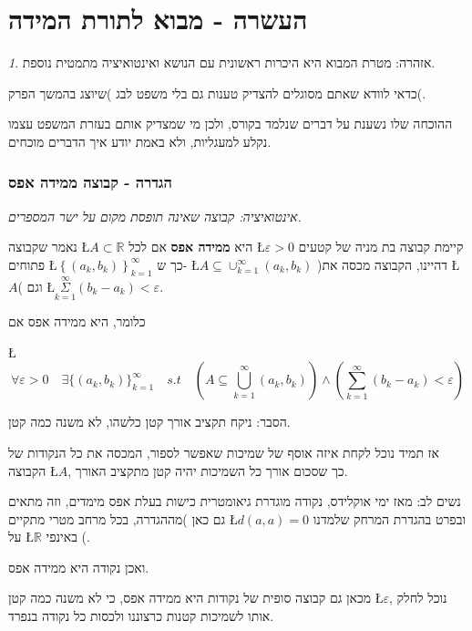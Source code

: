 \documentclass[english,hebrew]{article}
\theoremstyle{remark}
\newtheorem*{rem*}{\protect\remarkname}
\theoremstyle{definition}
\theoremstyle{plain}
\theoremstyle{remark}
\theoremstyle{plain}
\theoremstyle{plain}
\providecommand{\remarkname}{הערה}
\begin{document}
\part{העשרה - מבוא לתורת המידה}
\begin{rem*}
אזהרה: מטרת המבוא היא היכרות ראשונית עם הנושא ואינטואיציה מתמטית נוספת.

כדאי לוודא שאתם מסוגלים להצדיק טענות גם בלי משפט לבג )שיוצג בהמשך
הפרק(.

ההוכחה שלו נשענת על דברים שנלמד בקורס, ולכן מי שמצדיק אותם בעזרת המשפט
עצמו נקלע למעגליות, ולא באמת יודע איך הדברים מוכחים.
\end{rem*}

\section{הגדרה - קבוצה ממידה אפס}

\emph{אינטואיציה: קבוצה שאינה תופסת מקום על ישר המספרים.}

נאמר שקבוצה \L{$A\subset\mathbb{R}$} היא \textbf{ממידה אפס} אם לכל
\L{$\varepsilon>0$} קיימת קבוצה בת מניה של קטעים פתוחים \L{$\left\{ \left(a_{k},b_{k}\right)\right\} _{k=1}^{\infty}$}
כך ש- \L{$A\subseteq\cup_{k=1}^{\infty}\left(a_{k},b_{k}\right)$}
)דהיינו, הקבוצה מכסה את \L{$A$}( וגם \L{$\underset{k=1}{\overset{\infty}{\Sigma}}\left(b_{k}-a_{k}\right)<\varepsilon$}.

כלומר, היא ממידה אפס אם

\L{%
\[
\forall\varepsilon>0\quad\exists\{(a_{k},b_{k})\}_{k=1}^{\infty}\quad s.t\quad\left(A\subseteq\bigcup_{k=1}^{\infty}(a_{k},b_{k})\right)\land\left(\sum_{k=1}^{\infty}(b_{k}-a_{k})<\varepsilon\right)
\]
}%

הסבר: ניקח תקציב אורך קטן כלשהו, לא משנה כמה קטן.

אז תמיד נוכל לקחת איזה אוסף של שמיכות שאפשר לספור, המכסה את כל הנקודות
של הקבוצה \L{$A$}, כך שסכום אורך כל השמיכות יהיה קטן מתקציב האורך.

נשים לב: מאז ימי אוקלידס, נקודה מוגדרת גיאומטרית כישות בעלת אפס מימדים,
וזה מתאים גם כאן )מההגדרה, בכל מרחב מטרי מתקיים \L{$d\left(a,a\right)=0$}
ובפרט בהגדרת המרחק שלמדנו על \L{$\mathbb{R}$} באינפי {\endL}(.

ואכן נקודה היא ממידה אפס.

מכאן גם קבוצה סופית של נקודות היא ממידה אפס, כי לא משנה כמה קטן \L{$\varepsilon$},
נוכל לחלק אותו לשמיכות קטנות כרצוננו ולכסות כל נקודה בנפרד.
\end{document}
